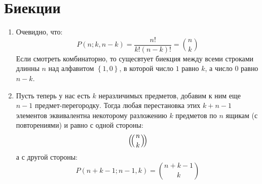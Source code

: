 \section{Биекции}

\begin{enumerate}
\item Очевидно, что: $$ P\left(n; k, n-k\right) = \frac{n!}{k!\left(n-k\right)!} = \binom{n}{k}$$ Если смотреть комбинаторно, то сущесвтует биекция между всеми строками длинны $n$ над алфавитом $\left\{1, 0\right\}$, в которой число $1$ равно $k$, а число $0$ равно $n-k$.

\item Пусть теперь у нас есть $k$ неразличимых предметов, добавим к ним еще $n-1$ предмет-перегородку. Тогда любая перестановка этих $k+n-1$ элементов эквивалентна некоторому разложению $k$ предметов по $n$ ящикам (с повторениями) и равно с одной стороны: $$ \left(\negmedspace\left({{n}\atop{k}}\right)\negmedspace\right) $$ а с другой стороны: $$ P\left(n+k-1; n-1, k\right) = \binom{n+k-1}{k} $$
\end{enumerate}
